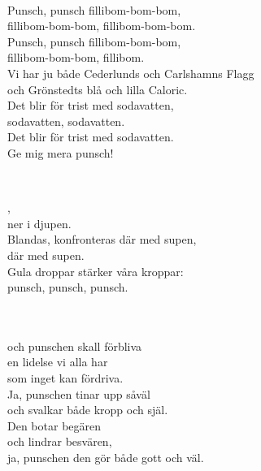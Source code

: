 
 \\       

\songtext{} 
Punsch, punsch fillibom-bom-bom,\\
fillibom-bom-bom, fillibom-bom-bom.\\
Punsch, punsch fillibom-bom-bom,\\
fillibom-bom-bom, fillibom.\\
Vi har ju både Cederlunds och Carlshamns Flagg\\
och Grönstedts blå och lilla Caloric.\\
Det blir för trist med sodavatten,\\
sodavatten, sodavatten.\\
Det blir för trist med sodavatten.\\
Ge mig mera punsch!\\


\newpage 


 \\       

,\\
ner i djupen.\\
Blandas, konfronteras där med supen,\\
där med supen.\\
Gula droppar stärker våra kroppar:\\
punsch, punsch, punsch.\\


 \\       

\\ 
och punschen skall förbliva\\ 
en lidelse vi alla har\\ 
som inget kan fördriva.\\ 
Ja, punschen tinar upp såväl\\ 
och svalkar både kropp och själ.\\ 
Den botar begären\\ 
och lindrar besvären,\\ 
ja, punschen den gör både gott och väl. 

